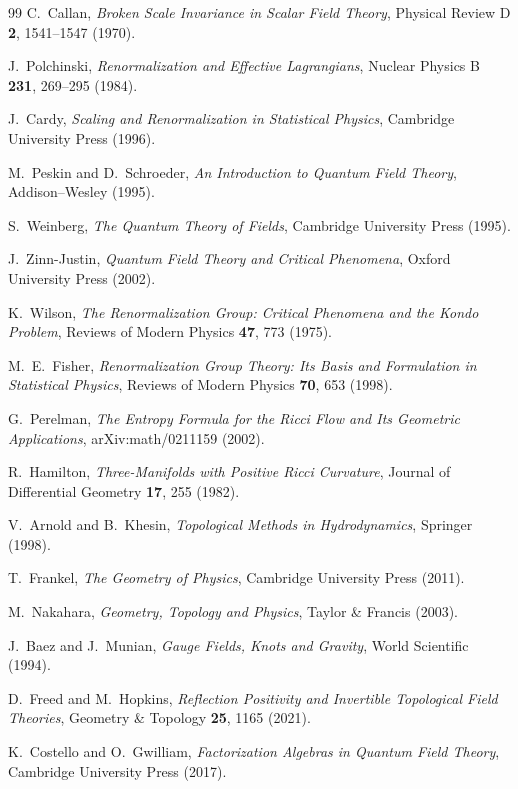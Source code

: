 \documentclass[12pt,a4paper]{article}
\theoremstyle{plain}
\theoremstyle{definition}
\theoremstyle{remark}
\begin{document}
\begin{thebibliography}{99}
C.~Callan,
\emph{Broken Scale Invariance in Scalar Field Theory},
Physical Review D \textbf{2}, 1541--1547 (1970).

J.~Polchinski,
\emph{Renormalization and Effective Lagrangians},
Nuclear Physics B \textbf{231}, 269--295 (1984).

J.~Cardy,
\emph{Scaling and Renormalization in Statistical Physics},
Cambridge University Press (1996).

M.~Peskin and D.~Schroeder,
\emph{An Introduction to Quantum Field Theory},
Addison--Wesley (1995).

S.~Weinberg,
\emph{The Quantum Theory of Fields},
Cambridge University Press (1995).

J.~Zinn-Justin,
\emph{Quantum Field Theory and Critical Phenomena},
Oxford University Press (2002).

K.~Wilson,
\emph{The Renormalization Group: Critical Phenomena and the Kondo Problem},
Reviews of Modern Physics \textbf{47}, 773 (1975).

M.~E.~Fisher,
\emph{Renormalization Group Theory: Its Basis and Formulation in Statistical Physics},
Reviews of Modern Physics \textbf{70}, 653 (1998).

G.~Perelman,
\emph{The Entropy Formula for the Ricci Flow and Its Geometric Applications},
arXiv:math/0211159 (2002).

R.~Hamilton,
\emph{Three-Manifolds with Positive Ricci Curvature},
Journal of Differential Geometry \textbf{17}, 255 (1982).

V.~Arnold and B.~Khesin,
\emph{Topological Methods in Hydrodynamics},
Springer (1998).

T.~Frankel,
\emph{The Geometry of Physics},
Cambridge University Press (2011).

M.~Nakahara,
\emph{Geometry, Topology and Physics},
Taylor \& Francis (2003).

J.~Baez and J.~Munian,
\emph{Gauge Fields, Knots and Gravity},
World Scientific (1994).

D.~Freed and M.~Hopkins,
\emph{Reflection Positivity and Invertible Topological Field Theories},
Geometry \& Topology \textbf{25}, 1165 (2021).

K.~Costello and O.~Gwilliam,
\emph{Factorization Algebras in Quantum Field Theory},
Cambridge University Press (2017).


\end{thebibliography}
\end{document}
